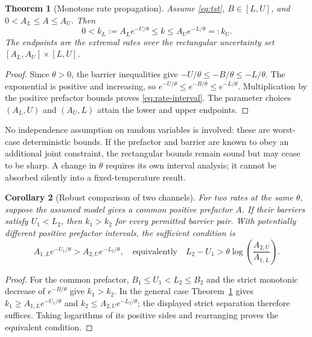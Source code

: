 \documentclass[11pt,a4paper]{article}
\theoremstyle{plain}
\newtheorem{theorem}{Theorem}[section]
\newtheorem{corollary}[theorem]{Corollary}
\theoremstyle{definition}
\theoremstyle{remark}
\begin{document}
\begin{theorem}[Monotone rate propagation]
\label{thm:rate}
Assume \eqref{eq:tst}, $B\in[L,U]$, and
$0<A_L\le A\le A_U$. Then
\begin{equation}
 0<k_L:=A_L e^{-U/\theta}\le k\le A_U e^{-L/\theta}=:k_U.
 \label{eq:rate-interval}
\end{equation}
The endpoints are the extremal rates over the rectangular uncertainty set
$[A_L,A_U]\times[L,U]$.
\end{theorem}
\begin{proof}
Since $\theta>0$, the barrier inequalities give
$-U/\theta\le-B/\theta\le-L/\theta$.
The exponential is positive and increasing, so
$e^{-U/\theta}\le e^{-B/\theta}\le e^{-L/\theta}$.
Multiplication by the positive prefactor bounds proves
\eqref{eq:rate-interval}. The parameter choices $(A_L,U)$ and $(A_U,L)$
attain the lower and upper endpoints.
\end{proof}

No independence assumption on random variables is involved: these are
worst-case deterministic bounds. If the prefactor and barrier are known to
obey an additional joint constraint, the rectangular bounds remain sound
but may cease to be sharp. A change in $\theta$ requires its own interval
analysis; it cannot be absorbed silently into a fixed-temperature result.

\begin{corollary}[Robust comparison of two channels]
\label{cor:ranking}
For two rates at the same $\theta$, suppose the assumed model gives a common
positive prefactor $A$. If their barriers satisfy $U_1<L_2$, then
$k_1>k_2$ for every permitted barrier pair. With potentially different
positive prefactor intervals, the sufficient condition is
\begin{equation}
 A_{1,L}e^{-U_1/\theta}>A_{2,U}e^{-L_2/\theta},
 \quad\text{equivalently}\quad
 L_2-U_1>\theta\log\!\left(\frac{A_{2,U}}{A_{1,L}}\right).
 \label{eq:robust-ranking}
\end{equation}
\end{corollary}
\begin{proof}
For the common prefactor, $B_1\le U_1<L_2\le B_2$ and the strict
monotonic decrease of $e^{-B/\theta}$ give $k_1>k_2$.
In the general case Theorem~\ref{thm:rate} gives
$k_1\ge A_{1,L}e^{-U_1/\theta}$ and
$k_2\le A_{2,U}e^{-L_2/\theta}$; the displayed strict separation
therefore suffices. Taking logarithms of its positive sides and rearranging
proves the equivalent condition.
\end{proof}
\end{document}
